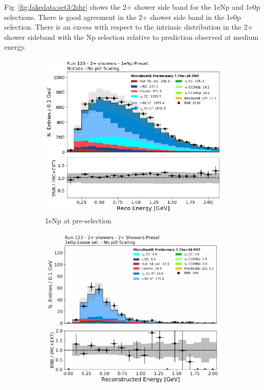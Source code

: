 Fig~\ref{fig:fakedata:set3:2shr} shows the 2+ shower side band for the 1eNp and 1e0p selections. There is good agreement in the 2+ shower side band in the 1e0p selection.  There is an excess with respect to the \nue intrinsic distribution in the 2+ shower sideband with the Np selection relative to prediction observed at medium energy.  

\begin{figure}[H] 
\begin{center}
    \begin{subfigure}[b]{0.45\textwidth}
    \centering
    \includegraphics[width=1.00\textwidth]{Fakedata/set3/np_2shr.pdf}
    \caption{\label{fig:fakedata:set3:2shrnp} 1eNp at pre-selection}
    \end{subfigure}
    \begin{subfigure}[b]{0.45\textwidth}
    \centering
    \includegraphics[width=1.00\textwidth]{Fakedata/set3/zp_2shr.pdf}

\end{subfigure}
\end{center}
\end{figure}
